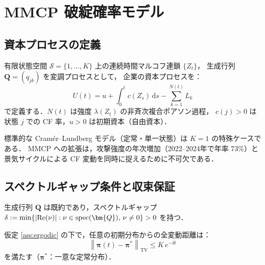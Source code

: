 \documentclass{ipsjlike}
\newcommand{\dd}{\mathrm{d}}
\newcommand{\norm}[1]{\left\lVert #1 \right\rVert}
\begin{document}
\section{MMCP 破綻確率モデル}
\label{sec:ruin}

\subsection{資本プロセスの定義}

\begin{definition}\label{def:capital}
  有限状態空間 $\mathcal{S} = \{1,\ldots,K\}$ 上の連続時間マルコフ連鎖 $\{Z_t\}$，
  生成行列 $\bm{Q} = (q_{jk})$ を変調プロセスとして，
  企業の資本プロセスを：
  \begin{equation}
    U(t) = u + \int_0^t c(Z_s)\,\dd s - \sum_{k=1}^{N(t)} L_k
    \label{eq:capital}
  \end{equation}
  で定義する．$N(t)$ は強度 $\lambda(Z_t)$ の非斉次複合ポアソン過程，
  $c(j) > 0$ は状態 $j$ での CF 率，$u > 0$ は初期資本（自由資本）．
\end{definition}

標準的な Cram\'{e}r--Lundberg モデル（定常・単一状態）は $K=1$ の特殊ケースである．
MMCP への拡張は，攻撃強度の年次増加（2022--2024年で年率 73\%）と
景気サイクルによる CF 変動を同時に捉えるために不可欠である．

\subsection{スペクトルギャップ条件と収束保証}

\begin{assumption}[エルゴード性]\label{ass:ergodic}
  生成行列 $\bm{Q}$ は既約であり，スペクトルギャップ
  $\delta := \min\{|{\rm Re}(\nu)| : \nu \in \mathrm{spec}(\bm{Q}),\, \nu \neq 0\} > 0$
  を持つ．
\end{assumption}

\begin{theorem}[定常分布への指数収束]\label{thm:ergodic}
  仮定 \ref{ass:ergodic} の下で，任意の初期分布からの全変動距離は：
  \begin{equation}
    \norm{\bm{\pi}(t) - \bm{\pi}^*}_{\mathrm{TV}} \leq K \, e^{-\delta t}
    \label{eq:conv}
  \end{equation}
  を満たす（$\bm{\pi}^*$：一意な定常分布）．
\end{theorem}
\end{document}
